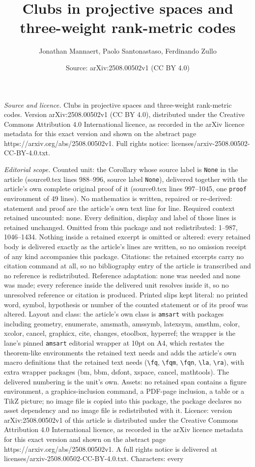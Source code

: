 \documentclass[10pt,a4paper]{amsart}
\title[Clubs in projective spaces and three-weight rank-metric code]{Clubs in projective spaces and three-weight rank-metric codes}
\author{Jonathan Mannaert, Paolo Santonastaso, Ferdinando Zullo}
\date{Source: arXiv:2508.00502v1 (CC BY 4.0)}
\begin{document}
\maketitle

\noindent\emph{Source and licence.} Clubs in projective spaces and three-weight rank-metric codes. Version arXiv:2508.00502v1 (CC BY 4.0), distributed under the Creative Commons Attribution 4.0 International licence, as recorded in the arXiv licence metadata for this exact version and shown on the abstract page https://arxiv.org/abs/2508.00502v1. Full rights notice: licenses/arxiv-2508.00502-CC-BY-4.0.txt.\par\smallskip

\noindent\textit{Editorial scope.} Counted unit: the Corollary whose source label is \texttt{None} in the article (source0.tex lines 988--996, source label \texttt{None}), delivered together with the article's own complete original proof of it (source0.tex lines 997--1045, one \texttt{proof} environment of 49 lines). No mathematics is written, repaired or re-derived: statement and proof are the article's own text line for line. Required context retained uncounted: none. Every definition, display and label of those lines is retained unchanged. Omitted from this package and not redistributed: 1--987, 1046--1434. Nothing inside a retained excerpt is omitted or altered: every retained body is delivered exactly as the article's lines are written, so no omission receipt of any kind accompanies this package. Citations: the retained excerpts carry no citation command at all, so no bibliography entry of the article is transcribed and no reference is redistributed. Reference adaptation: none was needed and none was made; every reference inside the delivered unit resolves inside it, so no unresolved reference or citation is produced. Printed slips kept literal: no printed word, symbol, hypothesis or number of the counted statement or of its proof was altered. Layout and class: the article's own class is \texttt{amsart} with packages including geometry, enumerate, amsmath, amssymb, latexsym, amsthm, color, xcolor, cancel, graphicx, cite, changes, etoolbox, hyperref; the wrapper is the lane's pinned \texttt{amsart} editorial wrapper at 10pt on A4, which restates the theorem-like environments the retained text needs and adds the article's own macro definitions that the retained text needs (\texttt{\textbackslash fq}, \texttt{\textbackslash fqm}, \texttt{\textbackslash fqn}, \texttt{\textbackslash la}, \texttt{\textbackslash ra}), with extra wrapper packages (bm, bbm, dsfont, xspace, cancel, mathtools). The delivered numbering is the unit's own. Assets: no retained span contains a figure environment, a graphics-inclusion command, a PDF-page inclusion, a table or a TikZ picture; no image file is copied into this package, the package declares no asset dependency and no image file is redistributed with it. Licence: version arXiv:2508.00502v1 of this article is distributed under the Creative Commons Attribution 4.0 International licence, as recorded in the arXiv licence metadata for this exact version and shown on the abstract page https://arxiv.org/abs/2508.00502v1. A full rights notice is delivered at licenses/arxiv-2508.00502-CC-BY-4.0.txt. Characters: every 
\end{document}
